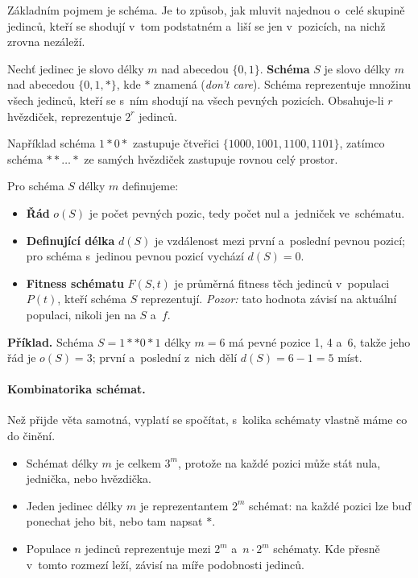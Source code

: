 \documentclass[11pt,a4paper]{article}
\theoremstyle{definition}
\begin{document}
Základním pojmem je schéma. Je to způsob, jak mluvit najednou o~celé skupině jedinců,
kteří se shodují v~tom podstatném a~liší se jen v~pozicích, na nichž zrovna nezáleží.

\begin{defbox}
Nechť jedinec je slovo délky $m$ nad abecedou $\{0,1\}$. \textbf{Schéma} $S$ je
slovo délky $m$ nad abecedou $\{0,1,*\}$, kde $*$ znamená  (\emph{don't care}). Schéma reprezentuje množinu všech jedinců, kteří
se s~ním shodují na všech pevných pozicích. Obsahuje-li $r$ hvězdiček,
reprezentuje $2^r$ jedinců.
\end{defbox}

Například schéma $1*0*$ zastupuje čtveřici $\{1000, 1001, 1100, 1101\}$, zatímco
schéma $**\ldots*$ ze samých hvězdiček zastupuje rovnou celý prostor.

\begin{defbox}
Pro schéma $S$ délky $m$ definujeme:
\begin{itemize}
\item \textbf{Řád} $o(S)$ je počet pevných pozic, tedy počet nul a~jedniček
  ve~schématu.
\item \textbf{Definující délka} $d(S)$ je vzdálenost mezi první a~poslední
  pevnou pozicí; pro schéma s~jedinou pevnou pozicí vychází $d(S) = 0$.
\item \textbf{Fitness schématu} $F(S,t)$ je průměrná fitness těch jedinců
  v~populaci $P(t)$, kteří schéma $S$ reprezentují. \emph{Pozor:} tato hodnota
  závisí na aktuální populaci, nikoli jen na $S$ a~$f$.
\end{itemize}
\end{defbox}

\textbf{Příklad.} Schéma $S = 1{*}{*}0{*}1$ délky $m=6$ má pevné pozice 1, 4 a~6,
takže jeho řád je $o(S) = 3$; první a~poslední z~nich dělí $d(S) = 6 - 1 = 5$ míst.

\paragraph{Kombinatorika schémat.}
Než přijde věta samotná, vyplatí se spočítat, s~kolika schématy vlastně máme co do činění.
\begin{itemize}
\item Schémat délky $m$ je celkem $3^m$, protože na každé pozici může stát nula,
  jednička, nebo hvězdička.
\item Jeden jedinec délky $m$ je reprezentantem $2^m$ schémat: na každé pozici lze
  buď ponechat jeho bit, nebo tam napsat $*$.
\item Populace $n$ jedinců reprezentuje mezi $2^m$ a~$n \cdot 2^m$ schématy. Kde přesně
  v~tomto rozmezí leží, závisí na míře podobnosti jedinců.
\end{itemize}
\end{document}
